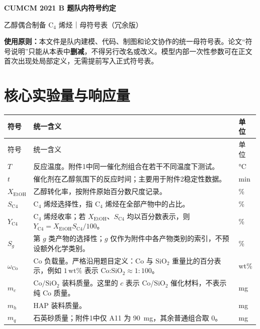 \documentclass[UTF8,zihao=-4,a4paper,fontset=none]{ctexart}
\begin{document}
\begin{center}
  {\sffamily\bfseries{} CUMCM 2021 B 题队内符号约定}\par
  \vspace{0.4em}
  {乙醇偶合制备 $\mathrm{C}_4$ 烯烃｜母符号表（冗余版）}
\end{center}

\noindent\textbf{使用原则：}本文件是队内建模、代码、制图和论文协作的统一母符号表。论文“符号说明”只能从本表中\textbf{删减}，不得另行改名或改义。模型内部一次性参数可在正文首次出现处局部定义，无需提前写入正式符号表。

\section{核心实验量与响应量}

\begin{longtable}{C{0.18\textwidth} L{0.52\textwidth} C{0.14\textwidth}}
\toprule
符号 & 统一含义 & 单位 \\
\midrule
\endfirsthead
\toprule
符号 & 统一含义 & 单位 \\
\midrule
\endhead
$T$ & 反应温度。附件1中同一催化剂组合在若干不同温度下测试。 & \si{\degreeCelsius} \\
$t$ & 催化剂在乙醇氛围下的反应时间；主要用于附件2稳定性数据。 & \si{\minute} \\
$X_{\mathrm{EtOH}}$ & 乙醇转化率，按附件原始百分数尺度记录。 & \% \\
$S_{\mathrm{C4}}$ & $\mathrm{C}_4$ 烯烃选择性，指 $\mathrm{C}_4$ 烯烃在全部产物中的占比。 & \% \\
$Y_{\mathrm{C4}}$ & $\mathrm{C}_4$ 烯烃收率；若 $X_{\mathrm{EtOH}}$、$S_{\mathrm{C4}}$ 均以百分数表示，则 $Y_{\mathrm{C4}}=X_{\mathrm{EtOH}}S_{\mathrm{C4}}/100$。 & \% \\
$S_g$ & 第 $g$ 类产物的选择性；$g$ 仅作为附件中各产物类别的索引，不预设额外化学类别。 & \% \\
$\omega_{\mathrm{Co}}$ & Co 负载量。严格沿用题目定义：Co 与 $\mathrm{SiO_2}$ 重量比的百分表示，例如 $1\,\mathrm{wt}\%$ 表示 Co:$\mathrm{SiO_2}\approx1:100$。 & wt\% \\
$m_c$ & $\mathrm{Co/SiO_2}$ 装料质量。这里的 $c$ 表示 Co/$\mathrm{SiO_2}$ 催化材料，不表示纯 Co 质量。 & \si{\milli\gram} \\
$m_h$ & HAP 装料质量。 & \si{\milli\gram} \\
$m_q$ & 石英砂质量；附件1中仅 A11 为 \SI{90}{\milli\gram}，其余普通组合取 0。 & \si{\milli\gram} \\

\end{longtable}
\end{document}
